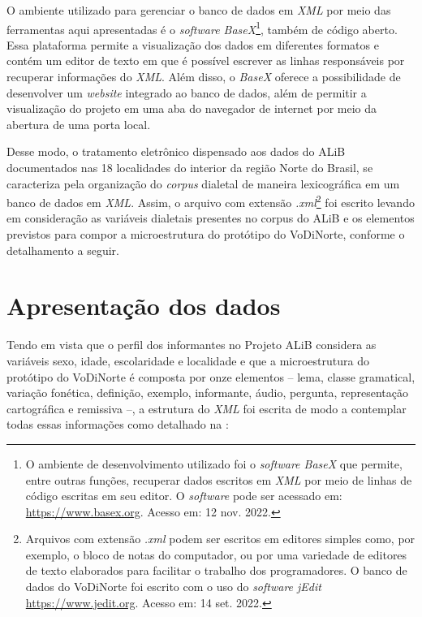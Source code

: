 \documentclass[portuguese]{textolivre}
\begin{document}
O ambiente utilizado para gerenciar o banco de dados em \emph{XML} por meio das ferramentas aqui apresentadas é o \emph{software BaseX}\footnote{O ambiente de desenvolvimento utilizado foi o \emph{software BaseX} que permite, entre outras funções, recuperar dados escritos em \emph{XML} por meio de linhas de código escritas em seu editor. O \emph{software} pode ser acessado em: \url{https://www.basex.org}. Acesso em: 12 nov. 2022.}, também de código aberto. Essa plataforma permite a visualização dos dados em diferentes formatos e contém um editor de texto em que é  possível escrever as linhas responsáveis por recuperar informações do \emph{XML}. Além disso, o \emph{BaseX} oferece a possibilidade de desenvolver um \emph{website} integrado ao banco de dados, além de permitir a visualização do projeto em uma aba do navegador de internet por meio da abertura de uma porta local. 

Desse modo, o tratamento eletrônico dispensado aos dados do ALiB documentados nas 18 localidades do interior da região Norte do Brasil, se caracteriza pela organização do \emph{corpus} dialetal de maneira lexicográfica em um banco de dados em \emph{XML}. Assim, o arquivo com extensão \emph{.xml}\footnote{Arquivos com extensão \emph{.xml} podem ser escritos em editores simples como, por exemplo, o bloco de notas do computador, ou por uma variedade de editores de texto elaborados para facilitar o trabalho dos programadores. O banco de dados do VoDiNorte foi escrito com o uso do \emph{software jEdit} \url{https://www.jedit.org}. Acesso em: 14 set. 2022.} foi escrito levando em consideração as variáveis dialetais presentes no corpus do ALiB e os elementos previstos para compor a microestrutura do protótipo do VoDiNorte, conforme o detalhamento a seguir.



\section{Apresentação dos dados}

Tendo em vista que o perfil dos informantes no Projeto ALiB considera as variáveis sexo, idade, escolaridade e localidade e que a microestrutura do protótipo do VoDiNorte é composta por onze elementos – lema, classe gramatical, variação fonética, definição, exemplo, informante, áudio, pergunta, representação cartográfica e remissiva –, a estrutura do \emph{XML} foi escrita de modo a contemplar todas essas informações como detalhado na :
\end{document}

